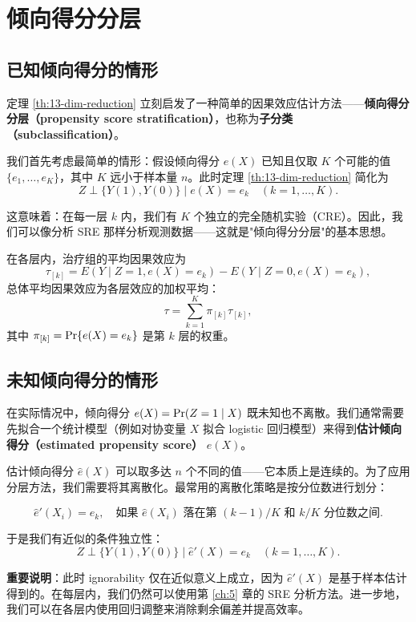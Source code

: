 \section{倾向得分分层}\label{sec:13-stratification}

\subsection{已知倾向得分的情形}\label{sec:13-known-pscore}

定理 \ref{th:13-dim-reduction} 立刻启发了一种简单的因果效应估计方法——\textbf{倾向得分分层（propensity score stratification）}，也称为\textbf{子分类（subclassification）}。

我们首先考虑最简单的情形：假设倾向得分 $e(X)$ 已知且仅取 $K$ 个可能的值 $\{e_1, \ldots, e_K\}$，其中 $K$ 远小于样本量 $n$。此时定理 \ref{th:13-dim-reduction} 简化为
\[
Z \perp \{Y(1), Y(0)\} \mid e(X) = e_k \quad (k = 1, \dots, K).
\]

这意味着：在每一层 $k$ 内，我们有 $K$ 个独立的完全随机实验（CRE）。因此，我们可以像分析 SRE 那样分析观测数据——这就是"倾向得分分层"的基本思想。

在各层内，治疗组的平均因果效应为
\[
\tau_{[k]} = E(Y \mid Z=1, e(X)=e_k) - E(Y \mid Z=0, e(X)=e_k),
\]
总体平均因果效应为各层效应的加权平均：
\[
\tau = \sum_{k=1}^K \pi_{[k]} \tau_{[k]},
\]
其中 $\pi_{[k]} = \operatorname{Pr}\{e(X) = e_k\}$ 是第 $k$ 层的权重。

\subsection{未知倾向得分的情形}\label{sec:13-unknown-pscore}

在实际情况中，倾向得分 $e(X) = \operatorname{Pr}(Z=1 \mid X)$ 既未知也不离散。我们通常需要先拟合一个统计模型（例如对协变量 $X$ 拟合 logistic 回归模型）来得到\textbf{估计倾向得分（estimated propensity score）} $\hat{e}(X)$。

估计倾向得分 $\hat{e}(X)$ 可以取多达 $n$ 个不同的值——它本质上是连续的。为了应用分层方法，我们需要将其离散化。最常用的离散化策略是按分位数进行划分：

\[
\hat{e}'(X_i) = e_k, \quad \text{如果 } \hat{e}(X_i) \text{ 落在第 }(k-1)/K \text{ 和 } k/K \text{ 分位数之间}.
\]

于是我们有近似的条件独立性：
\[
Z \perp \{Y(1), Y(0)\} \mid \hat{e}'(X) = e_k \quad (k = 1, \dots, K).
\]

\textbf{重要说明}：此时 ignorability 仅在近似意义上成立，因为 $\hat{e}'(X)$ 是基于样本估计得到的。在每层内，我们仍然可以使用第 \ref{ch:5} 章的 SRE 分析方法。进一步地，我们可以在各层内使用回归调整来消除剩余偏差并提高效率。

